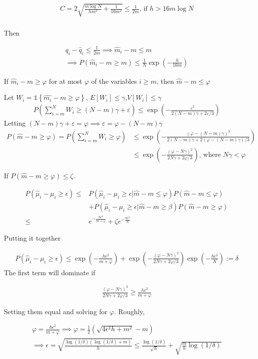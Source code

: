\documentclass{article}
\newcommand{\set}[1]{\left\{#1\right\}}
\newcommand{\ind}[1]{\mathds{1}\!\!\set{#1}}
\newcommand{\eqn}[1]{\begin{align}#1\end{align}}
\theoremstyle{plain}
\theoremstyle{definition}
\begin{document}
\begin{itemize}
\eqn {
C = 2\sqrt{\frac{m\log N}{hm^2}+\frac{1}{16m^2}} \leq \frac{1}{2m} \text{, if } h > 16m\log N \\
}

Then 

\eqn{
 q_i - \hat{q}_i \leq \frac{1}{2m} \implies \hat{m}_i - m \leq m \\
 \implies P(\hat{m}_i - m \geq m) \leq \frac{1}{N}\exp(-{\frac{h}{16m}})
}









If $\hat{m}_i - m \geq \varphi$ for at most $\varphi$ of the variables $i \geq m$, then $\hat{m} - m \leq \varphi$

Let $W_i = \ind{\hat{m_i}-m \geq \varphi}$, $E[W_i] \leq \gamma$,$V[W_i] \leq \gamma$ 
\eqn{
P(\sum_{i=m}^N W_i \geq (N-m)\gamma + \varepsilon) \leq \exp(-\frac{\varepsilon^2}{2(N-m)\gamma+2\varepsilon/3})
}
Letting $(N-m)\gamma + \varepsilon = \varphi \implies \varepsilon = \varphi - (N-m)\gamma$
\eqn{
P(\hat{m}-m \geq \varphi) =  P(\sum_{i=m}^N W_i \geq \varphi) &\leq \exp({-\frac{(\varphi-(N-m)\gamma)^2}{2(N-m)\gamma + 2(\varphi-(N-m)\gamma)/3}})\\
& \leq \exp({-\frac{(\varphi-N\gamma)^2}{2N\gamma + 2\varphi/3}}) \text{, where } N\gamma < \varphi
} 



If $P(\hat{m}-m \geq \varphi) \leq \zeta$. 



\eqn{
P(\hat{\mu}_i-\mu_i \geq \epsilon) \leq & P(\hat{\mu}_i-\mu_i \geq \epsilon |\hat{m}-m \leq \varphi )P(\hat{m}-m \leq \varphi) \\
& + P(\hat{\mu}_i-\mu_i \geq \epsilon |\hat{m}-m \geq \beta)P(\hat{m}-m \geq \varphi)\\  \leq & e^{-\frac{h\epsilon^2}{m+\varphi}} + \zeta e^{-\frac{h \epsilon^2}{N}}
}

Putting it together 

\eqn {
P(\hat{\mu}_i-\mu_i \geq \epsilon) \leq \exp({-\frac{h\epsilon^2}{m+\varphi}}) + \exp({-\frac{(\varphi-N\gamma)^2}{2N\gamma + 2\varphi/3}}) \exp({-\frac{h \epsilon^2}{N}}) := \delta
}
The first term will dominate if 

\eqn{
\frac{(\varphi-N\gamma)^2}{2N\gamma + 2\varphi/3} \geq \frac{h\epsilon^2}{m+\varphi}
}


Setting them equal and solving for $\varphi$. Roughly,

\eqn{
\varphi = \frac{h\epsilon^2}{m+\varphi} \implies \varphi = \frac{1}{2}(\sqrt{4\epsilon^2 h+ m^2} - m)\\
\implies \epsilon = \sqrt{\frac{\log(1/\delta)(\log(1/\delta)+m)}{h}} \leq \frac{\log(1/\delta)}{\sqrt{h}} + \sqrt{\frac{m}{h}\log(1/\delta)}
}


\end{itemize}
\end{document}
